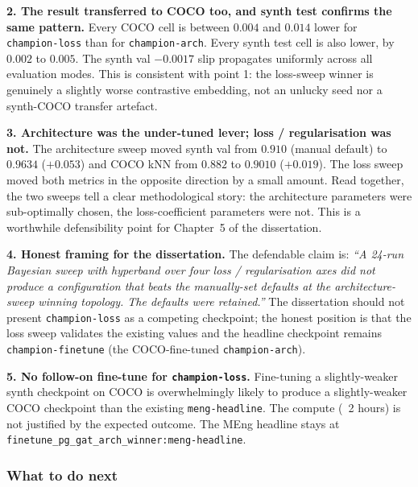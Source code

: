 \textbf{2. The result transferred to COCO too, and synth test confirms the same pattern.} Every COCO cell is between $0.004$ and $0.014$ lower for \texttt{champion-loss} than for \texttt{champion-arch}. Every synth test cell is also lower, by $0.002$ to $0.005$. The synth val $-0.0017$ slip propagates uniformly across all evaluation modes. This is consistent with point 1: the loss-sweep winner is genuinely a slightly worse contrastive embedding, not an unlucky seed nor a synth-COCO transfer artefact.

\textbf{3. Architecture was the under-tuned lever; loss / regularisation was not.} The architecture sweep moved synth val from $0.910$ (manual default) to $0.9634$ ($+0.053$) and COCO kNN from $0.882$ to $0.9010$ ($+0.019$). The loss sweep moved both metrics in the opposite direction by a small amount. Read together, the two sweeps tell a clear methodological story: the architecture parameters were sub-optimally chosen, the loss-coefficient parameters were not. This is a worthwhile defensibility point for Chapter~5 of the dissertation.

\textbf{4. Honest framing for the dissertation.} The defendable claim is: \emph{``A 24-run Bayesian sweep with hyperband over four loss / regularisation axes did not produce a configuration that beats the manually-set defaults at the architecture-sweep winning topology. The defaults were retained.''} The dissertation should not present \texttt{champion-loss} as a competing checkpoint; the honest position is that the loss sweep validates the existing values and the headline checkpoint remains \texttt{champion-finetune} (the COCO-fine-tuned \texttt{champion-arch}).

\textbf{5. No follow-on fine-tune for \texttt{champion-loss}.} Fine-tuning a slightly-weaker synth checkpoint on COCO is overwhelmingly likely to produce a slightly-weaker COCO checkpoint than the existing \texttt{meng-headline}. The compute (~2 hours) is not justified by the expected outcome. The MEng headline stays at \texttt{finetune\_pg\_gat\_arch\_winner:meng-headline}.

\subsubsection{What to do next}

